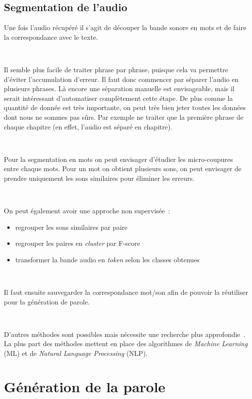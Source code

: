 		\subsection{Segmentation de l'audio}
		
	Une fois l'audio récupéré il s'agit de découper la bande sonore en mots
	et de faire la correspondance avec le texte.

	~	
	
	Il semble plus facile de traiter phrase par phrase, puisque cela va 
	permettre d'éviter l'accumulation d'erreur. Il faut donc commencer par
	séparer l'audio en plusieurs phrases. Là encore une séparation manuelle est
	envisageable, mais il serait intéressant d'automatiser complètement cette
	étape. De plus comme la quantité de donnée est très importante, on peut
	très bien jeter toutes les données dont nous ne sommes pas sûrs. Par exemple
	ne traiter que la première phrase de chaque chapitre (en effet, l'audio est
	séparé en chapitre).
	
	~	
	
	Pour la segmentation en mots on peut envisager d'étudier les micro-coupures
	entre chaque mots. Pour un mot on obtient plusieurs sons, on peut envisager de
	prendre uniquement les sons similaires pour éliminer les erreurs.
	
	~
	
	On peut également avoir une approche non supervisée~\cite{ludusan:hal-01026368}:
	\begin{itemize}
		\item regrouper les sons similaires par paire
		\item regrouper les paires en \textit{cluster} par F-score
		\item transformer la bande audio en \textit{token} selon les classes obtenues
	\end{itemize}
	
	~
	
	Il faut ensuite sauvegarder la correspondance mot/son afin de pouvoir la réutiliser
	pour la génération de parole.

	~

	D'autres méthodes sont possibles mais nécessite une recherche plus 
	approfondie~\cite{Panayotov2015}. La plus part des méthodes mettent en place
	des algorithmes de \textit{Machine Learning} (ML) et de
	\textit{Natural Language Processing} (NLP).
	
	\section{Génération de la parole}
		
